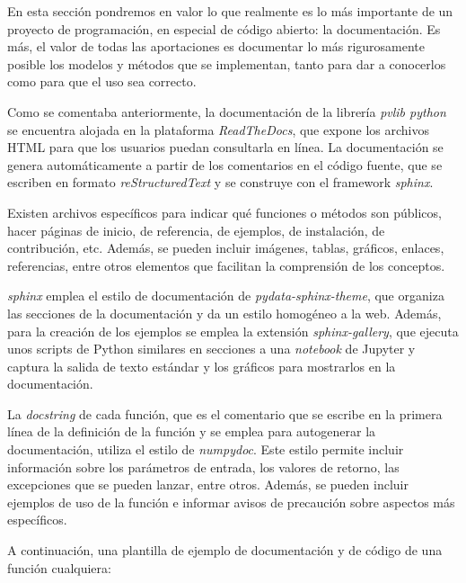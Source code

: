 En esta sección pondremos en valor lo que realmente es lo más importante de un proyecto de programación, en especial de código abierto: la documentación. Es más, el valor de todas las aportaciones es documentar lo más rigurosamente posible los modelos y métodos que se implementan, tanto para dar a conocerlos como para que el uso sea correcto.

Como se comentaba anteriormente, la documentación de la librería \textit{pvlib python} se encuentra alojada en la plataforma \textit{ReadTheDocs}, que expone los archivos HTML para que los usuarios puedan consultarla en línea. La documentación se genera automáticamente a partir de los comentarios en el código fuente, que se escriben en formato \textit{reStructuredText} y se construye con el framework \textit{sphinx}.

Existen archivos específicos para indicar qué funciones o métodos son públicos, hacer páginas de inicio, de referencia, de ejemplos, de instalación, de contribución, etc. Además, se pueden incluir imágenes, tablas, gráficos, enlaces, referencias, entre otros elementos que facilitan la comprensión de los conceptos.

\textit{sphinx} emplea el estilo de documentación de \textit{pydata-sphinx-theme}, que organiza las secciones de la documentación y da un estilo homogéneo a la web. Además, para la creación de los ejemplos se emplea la extensión \textit{sphinx-gallery}, que ejecuta unos scripts de Python similares en secciones a una \textit{notebook} de Jupyter y captura la salida de texto estándar y los gráficos para mostrarlos en la documentación.

La \textit{docstring} de cada función, que es el comentario que se escribe en la primera línea de la definición de la función y se emplea para autogenerar la documentación, utiliza el estilo de \textit{numpydoc}. Este estilo permite incluir información sobre los parámetros de entrada, los valores de retorno, las excepciones que se pueden lanzar, entre otros. Además, se pueden incluir ejemplos de uso de la función e informar avisos de precaución sobre aspectos más específicos.

A continuación, una plantilla de ejemplo de documentación y de código de una función cualquiera:

